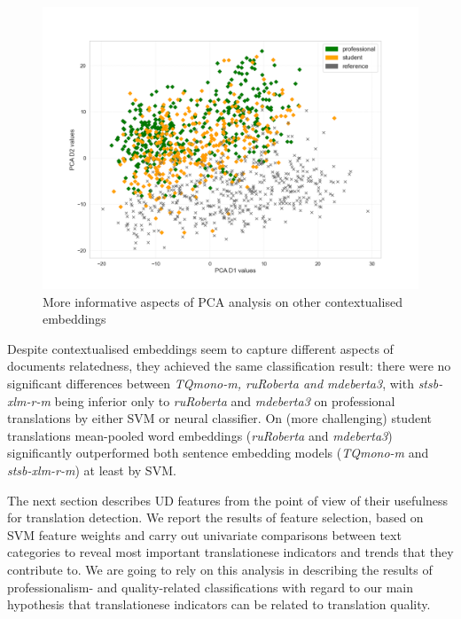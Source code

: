 \begin{figure}[H]
\begin{minipage}[c]{0.31\linewidth}
	\includegraphics[width=\linewidth]{figures/pca/var-ttype-ruRoberta-large-PCA-scatter}
\end{minipage}
\caption{\label{fig:other}More informative aspects of PCA analysis on other contextualised embeddings}	
\end{figure}


Despite contextualised embeddings seem to capture different aspects of documents relatedness, they achieved the same classification result: there were no significant differences between \textit{TQmono-m, ruRoberta and mdeberta3}, with \textit{stsb-xlm-r-m} being inferior only to \textit{ruRoberta} and \textit{mdeberta3} on professional translations by either SVM or neural classifier. 
On (more challenging) student translations mean-pooled word embeddings (\textit{ruRoberta} and \textit{mdeberta3}) significantly outperformed both sentence embedding models (\textit{TQmono-m} and \textit{stsb-xlm-r-m}) at least by SVM.

The next section describes UD features from the point of view of their usefulness for translation detection. We report the results of feature selection, based on SVM feature weights and carry out univariate comparisons between text categories to reveal most important translationese indicators and trends that they contribute to. We are going to rely on this analysis in describing the results of professionalism- and quality-related classifications with regard to our main hypothesis that translationese indicators can be related to translation quality.

